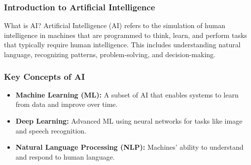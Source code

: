 \documentclass[aspectratio=169]{beamer}
\begin{document}
\frame{\titlepage}

\begin{frame}[fragile]
    \frametitle{Introduction to Artificial Intelligence}
    \begin{block}{What is AI?}
        Artificial Intelligence (AI) refers to the simulation of human intelligence in machines that are programmed to think, learn, and perform tasks that typically require human intelligence. This includes understanding natural language, recognizing patterns, problem-solving, and decision-making.
    \end{block}
\end{frame}

\begin{frame}[fragile]
    \frametitle{Key Concepts of AI}
    \begin{itemize}
        \item \textbf{Machine Learning (ML):} A subset of AI that enables systems to learn from data and improve over time.
        \item \textbf{Deep Learning:} Advanced ML using neural networks for tasks like image and speech recognition.
        \item \textbf{Natural Language Processing (NLP):} Machines' ability to understand and respond to human language.
    \end{itemize}
\end{frame}
\end{document}
